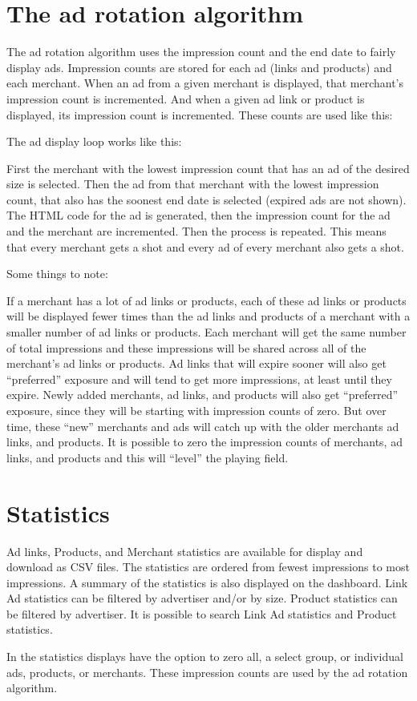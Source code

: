 \documentclass[letterpaper]{article}
\begin{document}
\section{The ad rotation algorithm}

The ad rotation algorithm uses the impression count and the end date to
fairly display ads.  Impression counts are stored for each ad (links
and products) and each merchant.  When an ad from a given merchant is
displayed, that merchant's impression count is incremented.  And when a
given ad link or product is displayed, its impression count is
incremented.  These counts are used like this:

The ad display loop works like this:

First the merchant with the lowest impression count that has an ad of
the desired size is selected.  Then the ad from that merchant with the
lowest impression count, that also has the soonest end date is selected
(expired ads are not shown).  The HTML code for the ad is generated,
then the impression count for the ad and the merchant are incremented.
Then the process is repeated.  This means that every merchant gets a
shot and every ad of every merchant also gets a shot.

Some things to note:

If a merchant has a lot of ad links or products, each of these ad links
or products will be displayed fewer times than the ad links and
products of a merchant with a smaller number of ad links or products. 
Each merchant will get the same number of total impressions and these
impressions will be shared across all of the merchant's ad links or
products.  Ad links that will expire sooner will also get ``preferred''
exposure and will tend to get more impressions, at least until they
expire.  Newly added merchants,  ad links, and products will also get
``preferred'' exposure, since they will be starting with impression
counts of zero.  But over time, these ``new'' merchants and ads will
catch up with the older merchants ad links, and products.  It is
possible to zero the impression counts of merchants, ad links, and
products and this will ``level'' the playing field.

\section{Statistics}

Ad links, Products, and Merchant statistics are available for display
and download as CSV files.  The statistics are ordered from fewest
impressions to most impressions. A summary of the statistics is also
displayed on the dashboard.  Link Ad statistics can be filtered by
advertiser and/or by size. Product statistics can be filtered by
advertiser. It is possible to search Link Ad statistics and Product
statistics. 

In the statistics displays have the option to zero all, a select group,
or individual ads, products, or merchants. These impression counts are
used by the ad rotation algorithm.
\end{document}
